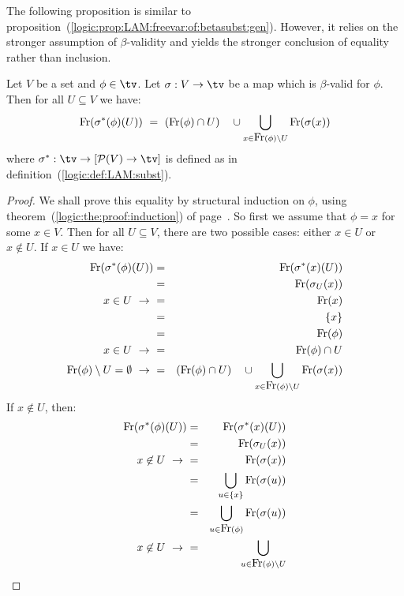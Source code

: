 The following proposition is similar to 
proposition~(\ref{logic:prop:LAM:freevar:of:betasubst:gen}). However,
it relies on the stronger assumption of $\beta$-validity and yields the
stronger conclusion of equality rather than inclusion.
\begin{prop}\label{logic:prop:LAM:freevar:of:betasubst:gen:valid}
Let $V$ be a set and $\phi\in\tv$. Let $\sigma:V\to\tv$ be a map which is
$\beta$-valid for $\phi$. Then for all $U\subseteq V$ we have:
    \[
        \free(\sigma^{*}(\phi)(U)) 
            \ =\ 
        (\free(\phi)\cap U)\ \ \ 
            \cup
        \bigcup_{x\in\free(\phi)\setminus U} \free(\sigma(x))
    \]
where $\sigma^{*}:\tv\to[{\cal P}(V)\to\tv]$ is defined as in 
definition~(\ref{logic:def:LAM:subst}).
\end{prop}
\begin{proof}
We shall prove this equality by structural induction on $\phi$, using
theorem~(\ref{logic:the:proof:induction}) of 
page~\pageref{logic:the:proof:induction}. So first we assume that $\phi=x$ 
for some $x\in V$. Then for all $U\subseteq V$, there are two possible cases: 
either $x\in U$ or $x\not\in U$. If $x\in U$ we have:
    \begin{eqnarray*}
        \mbox{\rm Fr}(\sigma^{*}(\phi)(U))
        &=&\mbox{\rm Fr}(\sigma^{*}(x)(U))\\
        &=&\mbox{\rm Fr}(\sigma_{U}(x))\\
        \mbox{$x\in U\ \rightarrow\ $}&=&\mbox{\rm Fr}(x)\\
         &=&\{x\}\\
         &=&\mbox{\rm Fr}(\phi)\\
        \mbox{$x\in U\ \rightarrow\ $}&=&\mbox{\rm Fr}(\phi)\cap U\\
        \mbox{$\mbox{\rm Fr}(\phi)\setminus U = \emptyset\ \rightarrow\ $} &=& 
            (\mbox{\rm Fr}(\phi)\cap U)\ \ \ \cup
            \bigcup_{x\in\mbox{\rm Fr}(\phi)\setminus U} \mbox{\rm Fr}(\sigma(x))
    \end{eqnarray*}
If $x\not\in U$, then:
     \begin{eqnarray*}
        \free(\sigma^{*}(\phi)(U))
        &=&\free(\sigma^{*}(x)(U))\\
        &=&\free(\sigma_{U}(x))\\
        \mbox{$x\not\in U\ \rightarrow\ $}&=&\free(\sigma(x))\\
        &=&\bigcup_{u\in\{x\}} \free(\sigma(u))\\
        &=&\bigcup_{u\in\free(\phi)} \free(\sigma(u))\\
        \mbox{$x\not\in U\ \rightarrow\ $}&=&\bigcup_{u\in\free(\phi)\setminus U} 

\end{eqnarray*}
\end{proof}
